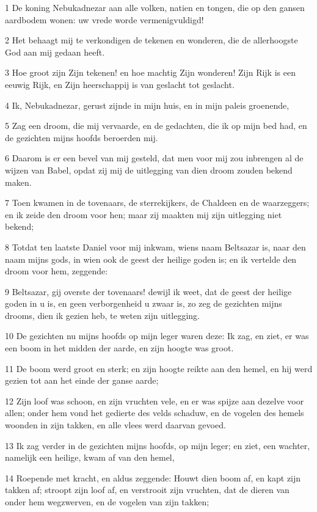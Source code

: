 \par 1 De koning Nebukadnezar aan alle volken, natien en tongen, die op den gansen aardbodem wonen: uw vrede worde vermenigvuldigd!
\par 2 Het behaagt mij te verkondigen de tekenen en wonderen, die de allerhoogste God aan mij gedaan heeft.
\par 3 Hoe groot zijn Zijn tekenen! en hoe machtig Zijn wonderen! Zijn Rijk is een eeuwig Rijk, en Zijn heerschappij is van geslacht tot geslacht.
\par 4 Ik, Nebukadnezar, gerust zijnde in mijn huis, en in mijn paleis groenende,
\par 5 Zag een droom, die mij vervaarde, en de gedachten, die ik op mijn bed had, en de gezichten mijns hoofds beroerden mij.
\par 6 Daarom is er een bevel van mij gesteld, dat men voor mij zou inbrengen al de wijzen van Babel, opdat zij mij de uitlegging van dien droom zouden bekend maken.
\par 7 Toen kwamen in de tovenaars, de sterrekijkers, de Chaldeen en de waarzeggers; en ik zeide den droom voor hen; maar zij maakten mij zijn uitlegging niet bekend;
\par 8 Totdat ten laatste Daniel voor mij inkwam, wiens naam Beltsazar is, naar den naam mijns gods, in wien ook de geest der heilige goden is; en ik vertelde den droom voor hem, zeggende:
\par 9 Beltsazar, gij overste der tovenaars! dewijl ik weet, dat de geest der heilige goden in u is, en geen verborgenheid u zwaar is, zo zeg de gezichten mijns drooms, dien ik gezien heb, te weten zijn uitlegging.
\par 10 De gezichten nu mijns hoofds op mijn leger waren deze: Ik zag, en ziet, er was een boom in het midden der aarde, en zijn hoogte was groot.
\par 11 De boom werd groot en sterk; en zijn hoogte reikte aan den hemel, en hij werd gezien tot aan het einde der ganse aarde;
\par 12 Zijn loof was schoon, en zijn vruchten vele, en er was spijze aan dezelve voor allen; onder hem vond het gedierte des velds schaduw, en de vogelen des hemels woonden in zijn takken, en alle vlees werd daarvan gevoed.
\par 13 Ik zag verder in de gezichten mijns hoofds, op mijn leger; en ziet, een wachter, namelijk een heilige, kwam af van den hemel,
\par 14 Roepende met kracht, en aldus zeggende: Houwt dien boom af, en kapt zijn takken af; stroopt zijn loof af, en verstrooit zijn vruchten, dat de dieren van onder hem wegzwerven, en de vogelen van zijn takken;
